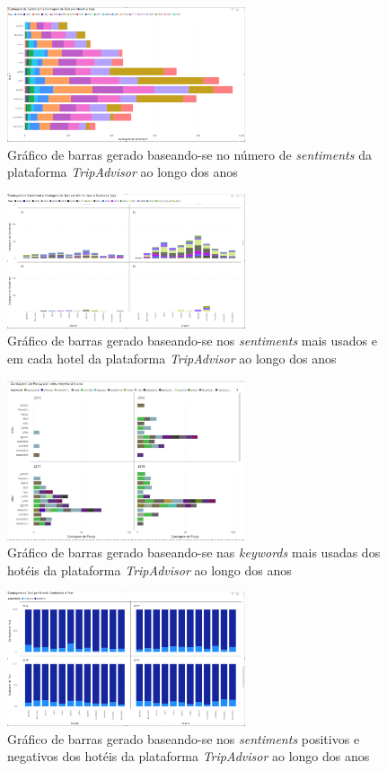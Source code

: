 \begin{figure}[!htb]
\centering
\includegraphics[width=7cm]{figuras/NrReviewsPerYear/TableGraph6.PNG}
\caption{Gráfico de barras gerado baseando-se no número de \textit{sentiments} da plataforma \textit{TripAdvisor} ao longo dos anos}
\label{fig:exemplofig}
\end{figure}

\begin{figure}[!htb]
\centering
\includegraphics[width=7cm]{figuras/NrReviewsPerYear&BusinessType/5.PNG}
\caption{Gráfico de barras gerado baseando-se nos \textit{sentiments} mais usados e em cada hotel da plataforma \textit{TripAdvisor} ao longo dos anos}
\label{fig:exemplofig}
\end{figure}

\begin{figure}[!htb]
\centering
\includegraphics[width=7cm]{figuras/Keyword/keyword mais usadas para cada ano.JPG}
\caption{Gráfico de barras gerado baseando-se nas \textit{keywords} mais usadas dos hotéis da plataforma \textit{TripAdvisor} ao longo dos anos}
\label{fig:exemplofig}
\end{figure}

\begin{figure}[!htb]
\centering
\includegraphics[width=7cm]{figuras/Pos&NegSentiments/TableGraph4.PNG}
\caption{Gráfico de barras gerado baseando-se nos \textit{sentiments} positivos e negativos dos hotéis da plataforma \textit{TripAdvisor} ao longo dos anos}
\label{fig:exemplofig}
\end{figure}

